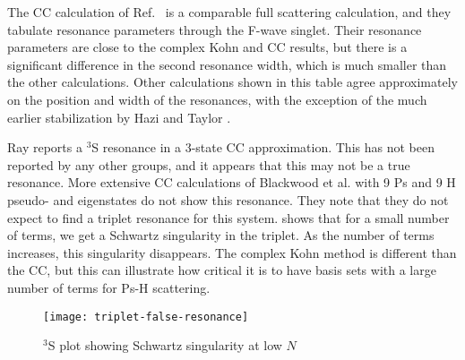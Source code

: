 \documentclass[Dissertation.tex]{subfiles}
\begin{document}
The CC calculation of Ref.~\cite{Walters2004} is a comparable full scattering calculation, and they tabulate resonance parameters through the F-wave singlet. Their resonance parameters are close to the complex Kohn and CC results, but there is a significant difference in the second resonance width, which is much smaller than the other calculations. Other calculations shown in this table agree approximately on the position and width of the resonances, with the exception of the much earlier stabilization by Hazi and Taylor \cite{Hazi1970}.


Ray \cite{Ray2006} reports a $^3$S resonance in a 3-state CC approximation. This has not been reported by any other groups, and it appears that this may not be a true resonance. 
More extensive CC calculations of Blackwood et al. \cite{Blackwood2002} with 9 Ps and 9 H pseudo- and eigenstates do not show this resonance. They note that they do not expect to find a triplet resonance for this system.  shows that for a small number of terms, we get a Schwartz singularity in the triplet. As the number of terms increases, this singularity disappears. The complex Kohn method is different than the CC, but this can illustrate how critical it is to have basis sets with a large number of terms for Ps-H scattering.

\begin{figure}[H]
	\centering
	\texttt{[image: triplet-false-resonance]}
	\caption{$^3$S plot showing Schwartz singularity at low $N$}
	\label{fig:triplet-false-resonance}
\end{figure}





\biblio
\end{document}
